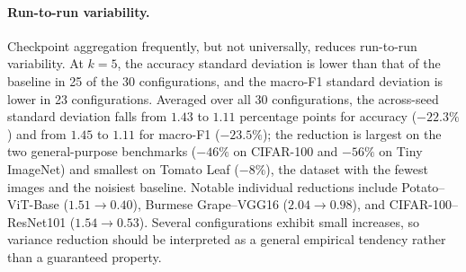 \documentclass[runningheads]{llncs}
\begin{document}
\paragraph{Run-to-run variability.}
Checkpoint aggregation frequently, but not universally, reduces run-to-run
variability. At $k=5$, the accuracy standard deviation is lower than that of
the baseline in 25 of the 30 configurations, and the macro-F1 standard
deviation is lower in 23 configurations. Averaged over all 30 configurations,
the across-seed standard deviation falls from $1.43$ to $1.11$ percentage
points for accuracy ($-22.3\%$) and from $1.45$ to $1.11$ for macro-F1
($-23.5\%$); the reduction is largest on the two general-purpose benchmarks
($-46\%$ on CIFAR-100 and $-56\%$ on Tiny ImageNet) and smallest on Tomato
Leaf ($-8\%$), the dataset with the fewest images and the noisiest baseline.
Notable individual reductions include
Potato--ViT-Base ($1.51\rightarrow0.40$), Burmese Grape--VGG16
($2.04\rightarrow0.98$), and CIFAR-100--ResNet101
($1.54\rightarrow0.53$). Several configurations exhibit small increases,
so variance reduction should be interpreted as a general empirical tendency
rather than a guaranteed property.
\end{document}
